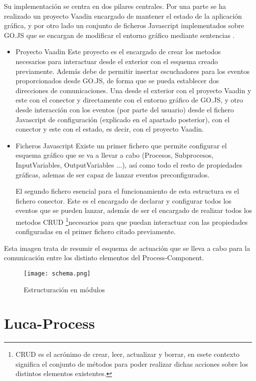 		Su implementación se centra en dos pilares centrales. Por una parte se ha realizado un proyecto Vaadin encargado de mantener el estado de la aplicación gráfica, y por otro lado un conjunto de ficheros Javascript implementados sobre GO.JS que se encargan de modificar el entorno gráfico mediante sentencias .
		\begin{itemize}
			\item Proyecto Vaadin
			\subitem Este proyecto es el encargado de crear los metodos necesarios para interactuar desde el exterior con el esquema creado previamente. Además debe de permitir insertar escuchadores para los eventos proporcionados desde GO.JS, de forma que se pueda establecer dos direcciones de comunicaciones. Una desde el exterior con el proyecto Vaadin y este con el conector y directamente con el entorno gráfico de GO.JS, y otro desde interacción con los eventos (por parte del usuario) desde el fichero Javascript de configuración (explicado en el apartado posterior), con el conector y este con el estado, es decir, con el proyecto Vaadin.
			
			\item Ficheros Javascript
			\subitem Existe un primer fichero que permite configurar el esquema gráfico que se va a llevar a cabo (Procesos, Subprocesos, InputVariables, OutputVariables ...), así como todo el resto de propiedades gráficas, ademas de ser capaz de lanzar eventos preconfigurados.
			
			\vspace{5mm}
			
			El segundo fichero esencial para el funcionamiento de esta estructura es el fichero conector. Este es el encargado de declarar y configurar todos los eventos que se pueden lanzar, además de ser el encargado de realizar todos los metodos CRUD \footnote{CRUD es el acrónimo de crear, leer, actualizar y borrar, en esete contexto significa el conjunto de métodos para poder realizar dichas acciones sobre los distintos elementos existentes.}necesarios para que puedan interactuar con las propiedades configuradas en el primer fichero citado previamente.
		\end{itemize}
	
		Esta imagen trata de  resumir el esquema de actuación que se lleva a cabo para la comunicación entre los distinto elementos del Process-Component.
		
		\begin{figure}[H]
			\centering
			\texttt{[image: schema.png]}
			\caption{Estructuración en módulos}\label{fig:schema}
		\end{figure}
		
		
		\section{Luca-Process}
	